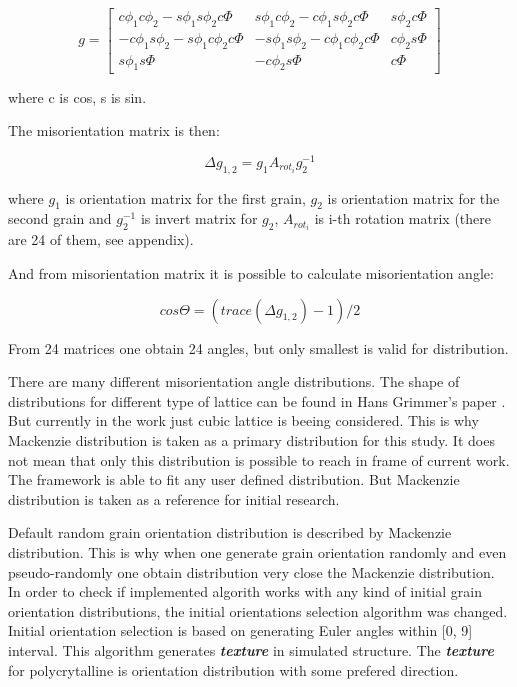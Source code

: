 \documentclass[12pt]{report}
\begin{document}
\begin{equation} \label{orientmatrix}
g = \begin{bmatrix}
    c\phi_1c\phi_2 - s\phi_1s\phi_2c\Phi & s\phi_1c\phi_2 - c\phi_1s\phi_2c\Phi & s\phi_2c\Phi \\
    -c\phi_1s\phi_2 - s\phi_1c\phi_2c\Phi & -s\phi_1s\phi_2 - c\phi_1c\phi_2c\Phi & c\phi_2s\Phi \\
    s\phi_1s\Phi & -c\phi_2s\Phi & c\Phi
\end{bmatrix}
\end{equation}
\bigbreak

where c is cos, s is sin.

The misorientation matrix is then:

\begin{equation} \label{mismatrix}
\Delta g_{1,2} = g_1A_{rot_i}g^{-1}_2
\end{equation}
\bigbreak

where $g_1$ is orientation matrix for the first grain, $g_2$ is orientation matrix for the second grain and $g^{-1}_2$ is invert matrix for $g_2$, $A_{rot_i}$ is i-th rotation matrix (there are 24 of them, see appendix).

And from misorientation matrix it is possible to calculate misorientation angle:

\begin{equation} \label{misangle}
cos\Theta = (trace(\Delta g_{1,2}) - 1)/2
\end{equation}
\bigbreak

From 24 matrices one obtain 24 angles, but only smallest is valid for distribution.

There are many different misorientation angle distributions. The shape of distributions for different type of lattice can be found in Hans Grimmer's paper \cite{hans79}. But currently in the work just cubic lattice is beeing considered. This is why Mackenzie distribution \cite{mack58} is taken as a primary distribution for this study. It does not mean that only this distribution is possible to reach in frame of current work. The framework is able to fit any user defined distribution. But Mackenzie distribution is taken as a reference for initial research. 

Default random grain orientation distribution is described by Mackenzie distribution. This is why when one generate grain orientation randomly and even pseudo-randomly one obtain distribution very close the Mackenzie distribution. In order to check if implemented algorith works with any kind of initial grain orientation distributions, the initial orientations selection algorithm was changed. Initial orientation selection is based on generating Euler angles within [0\degree, 9\degree] interval. This algorithm generates \textit{\textbf{texture}} in simulated structure. The \textit{\textbf{texture}} for polycrytalline is orientation distribution with some prefered direction.
\end{document}
